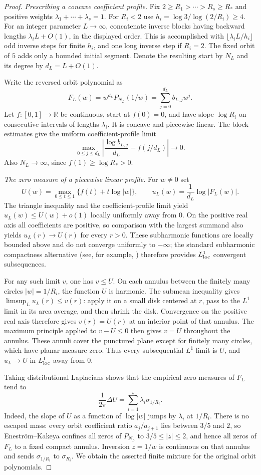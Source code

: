 \documentclass[11pt,a4paper]{article}
\theoremstyle{definition}
\theoremstyle{remark}
\numberwithin{equation}{section}
\begin{document}
\begin{proof}
\emph{Prescribing a concave coefficient profile.}
Fix $2\ge R_1>\cdots>R_s\ge R_*$ and positive weights
$\lambda_1+\cdots+\lambda_s=1$. For $R_i<2$ use
$h_i=\log3/\log(2/R_i)\ge4$. For an integer parameter $L\to\infty$,
concatenate inverse blocks having backward lengths
$\lambda_iL+O(1)$, in the displayed order. This is accomplished
with $\lfloor\lambda_iL/h_i\rfloor$ odd inverse steps for finite
$h_i$, and one long inverse step if $R_i=2$. The fixed orbit of $5$
adds only a bounded initial segment. Denote the resulting start by
$N_L$ and its degree by $d_L=L+O(1)$.

Write the reversed orbit polynomial as
\[
 F_L(w)=w^{d_L}P_{N_L}(1/w)=\sum_{j=0}^{d_L}b_{L,j}w^j.
\]
Let $f:[0,1]\to\mathbb R$ be continuous, start at $f(0)=0$, and
have slope $\log R_i$ on consecutive intervals of lengths
$\lambda_i$. It is concave and piecewise linear. The block estimates
give the uniform coefficient-profile limit
\[
 \max_{0\le j\le d_L}
 \left|\frac{\log b_{L,j}}{d_L}-f(j/d_L)\right|\longrightarrow0.
\]
Also $N_L\to\infty$, since $f(1)\ge\log R_*>0$.

\emph{The zero measure of a piecewise linear profile.}
For $w\ne0$ set
\[
 U(w)=\max_{0\le t\le1}\{f(t)+t\log|w|\},
 \qquad u_L(w)=\frac1{d_L}\log|F_L(w)|.
\]
The triangle inequality and the coefficient-profile limit yield
$u_L(w)\le U(w)+o(1)$ locally uniformly away from $0$. On the
positive real axis all coefficients are positive, so comparison
with the largest summand also yields $u_L(r)\to U(r)$ for every
$r>0$. These subharmonic functions are locally bounded above and
do not converge uniformly to $-\infty$; the standard subharmonic compactness alternative
(see, for example, \cite[p.~15]{R100}) therefore provides $L^1_{\rm loc}$ convergent subsequences.

For any such limit $v$, one has $v\le U$. On each annulus between
the finitely many circles $|w|=1/R_i$, the function $U$ is harmonic.
The submean inequality gives $\limsup_L u_L(r)\le v(r)$: apply it
on a small disk centered at $r$, pass to the $L^1$ limit in its area
average, and then shrink the disk. Convergence on the positive real
axis therefore gives $v(r)=U(r)$ at an interior point of that annulus.
The maximum principle applied to $v-U\le0$ then gives $v=U$
throughout the annulus. These annuli cover the punctured plane
except for finitely many circles, which have planar measure zero.
Thus every subsequential $L^1$ limit is $U$, and $u_L\to U$ in
$L^1_{\rm loc}$ away from $0$.

Taking distributional Laplacians shows that the empirical zero
measures of $F_L$ tend to
\[
 \frac1{2\pi}\Delta U
 =\sum_{i=1}^s\lambda_i\sigma_{1/R_i}.
\]
Indeed, the slope of $U$ as a function of $\log|w|$ jumps by
$\lambda_i$ at $1/R_i$. There is no escaped mass: every orbit
coefficient ratio $a_j/a_{j+1}$ lies between $3/5$ and $2$, so
Enestr\"om--Kakeya confines all zeros of $P_{N_L}$ to
$3/5\le|z|\le2$, and hence all zeros of $F_L$ to a fixed compact
annulus. Inversion $z=1/w$ is continuous on that annulus and sends
$\sigma_{1/R_i}$ to $\sigma_{R_i}$. We obtain the asserted finite
mixture for the original orbit polynomials.


\end{proof}
\end{document}
